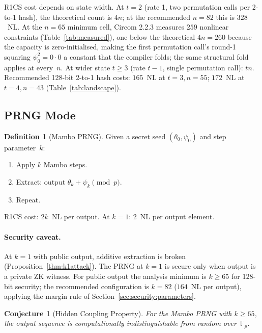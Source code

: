 \documentclass[11pt,a4paper]{article}
\newtheorem{conjecture}[theorem]{Conjecture}
\theoremstyle{definition}
\newtheorem{definition}[theorem]{Definition}
\newcommand{\Fp}{\mathbb{F}_p}
\begin{document}
R1CS cost depends on state width. At $t\!=\!2$ (rate 1, two permutation
calls per 2-to-1 hash), the theoretical count is $4n$; at the
recommended $n\!=\!82$ this is $328$~NL. At the $n\!=\!65$ minimum
cell, Circom 2.2.3 measures $259$ nonlinear constraints
(Table~\ref{tab:measured}), one below the theoretical $4n = 260$
because the capacity is zero-initialised, making the first
permutation call's round-1 squaring $\psi_0^2 = 0 \cdot 0$ a
constant that the compiler folds; the same structural fold applies at
every~$n$.
At wider state $t\!\ge\!3$ (rate $t\!-\!1$, single permutation call): $tn$.
Recommended 128-bit 2-to-1 hash costs: $165$~NL at $t\!=\!3, n\!=\!55$;
$172$~NL at $t\!=\!4, n\!=\!43$
(Table~\ref{tab:landscape}).



\subsection{PRNG Mode}\label{sec:inst:prng}

\begin{definition}[Mambo PRNG]\label{def:prng}
Given a secret seed $(\theta_0, \psi_0)$ and step parameter~$k$:
\begin{enumerate}[nosep]
  \item Apply $k$ Mambo steps.
  \item Extract: output $\theta_k + \psi_k \pmod{p}$.
  \item Repeat.
\end{enumerate}
R1CS cost: $2k$~NL per output. At $k=1$: 2~NL per output element.
\end{definition}

\paragraph{Security caveat.}
At $k=1$ with public output, additive extraction is broken
(Proposition~\ref{thm:k1attack}). The PRNG at $k=1$ is secure only when
output is a private ZK witness. For public output the analysis minimum
is $k \ge 65$ for 128-bit security; the recommended configuration is
$k = 82$ ($164$~NL per output), applying the margin rule of
Section~\ref{sec:security:parameters}.

\begin{conjecture}[Hidden Coupling Property]\label{conj:hcp}
For the Mambo PRNG with $k \ge 65$, the output sequence is computationally
indistinguishable from random over~$\Fp$.
\end{conjecture}
\end{document}
